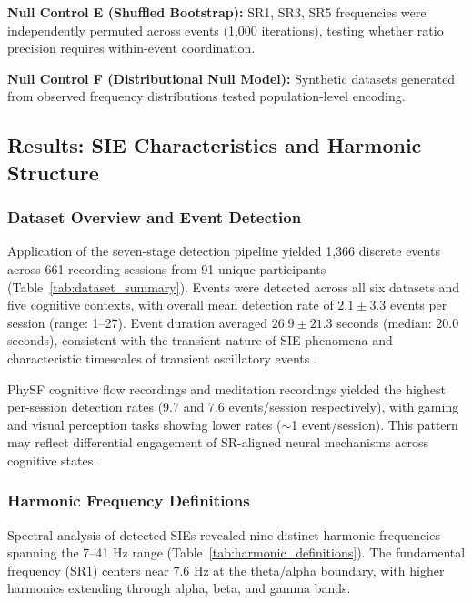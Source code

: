 \documentclass[11pt,a4paper]{article}
\begin{document}
\textbf{Null Control E (Shuffled Bootstrap):} SR1, SR3, SR5 frequencies were independently permuted across events (1,000 iterations), testing whether ratio precision requires within-event coordination.

\textbf{Null Control F (Distributional Null Model):} Synthetic datasets generated from observed frequency distributions tested population-level encoding.

\subsection{Results: SIE Characteristics and Harmonic Structure}

\subsubsection{Dataset Overview and Event Detection}
Application of the seven-stage detection pipeline yielded 1,366 discrete events across 661 recording sessions from 91 unique participants (Table~\ref{tab:dataset_summary}). Events were detected across all six datasets and five cognitive contexts, with overall mean detection rate of $2.1 \pm 3.3$ events per session (range: 1--27). Event duration averaged $26.9 \pm 21.3$ seconds (median: 20.0 seconds), consistent with the transient nature of SIE phenomena and characteristic timescales of transient oscillatory events \parencite{siegel2012spectral}.

PhySF cognitive flow recordings and meditation recordings yielded the highest per-session detection rates (9.7 and 7.6 events/session respectively), with gaming and visual perception tasks showing lower rates ($\sim$1 event/session). This pattern may reflect differential engagement of SR-aligned neural mechanisms across cognitive states.

\subsubsection{Harmonic Frequency Definitions}
Spectral analysis of detected SIEs revealed nine distinct harmonic frequencies spanning the 7--41 Hz range (Table~\ref{tab:harmonic_definitions}). The fundamental frequency (SR1) centers near 7.6 Hz at the theta/alpha boundary, with higher harmonics extending through alpha, beta, and gamma bands.
\end{document}
